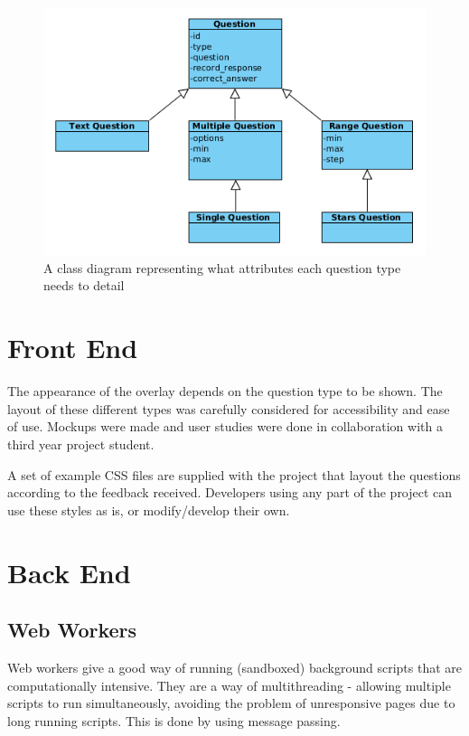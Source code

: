 \begin{figure}
\centering
\includegraphics[width=12cm]{../figures/questions_class_diagram.png}
\caption{A class diagram representing what attributes each question type needs to detail}
\label{Figure:questions_class_diagram}
\end{figure}

\section{Front End}
\label{Section:Front end}

The appearance of the overlay depends on the question type to be shown. The
layout of these different types was carefully considered for accessibility and
ease of use. Mockups were made and user studies were done in collaboration with
a third year project student.

A set of example \gls{CSS} files are supplied with the project that layout the
questions according to the feedback received. Developers using any part of the
project can use these styles as is, or modify/develop their own.

\section{Back End}
\label{Section:Back end}

\subsection{Web Workers}
\label{Subsection:WebWorkers}

Web workers give a good way of running (sandboxed) background scripts that are
computationally intensive. They are a way of multithreading - allowing multiple
scripts to run simultaneously, avoiding the problem of unresponsive pages due
to long running scripts. This is done by using message passing.

